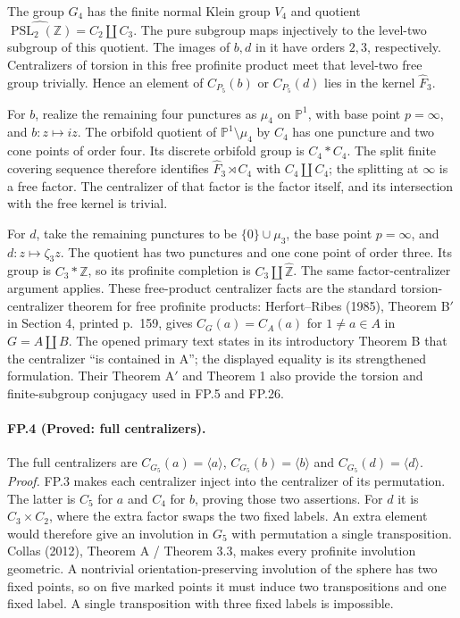 The group $G_4$ has the finite normal Klein group $V_4$ and quotient
$\widehat{\operatorname{PSL}_2(\mathbb Z)}=C_2\amalg C_3$.
The pure subgroup maps injectively to the level-two subgroup of this
quotient. The images of $b,d$ in it have orders $2,3$, respectively.
Centralizers of torsion in this free profinite product meet that level-two
free group trivially. Hence an element of $C_{P_5}(b)$ or $C_{P_5}(d)$ lies
in the kernel $\widehat F_3$.

For $b$, realize the remaining four punctures as $\mu_4$ on
$\mathbb P^1$, with base point $p=\infty$, and $b:z\mapsto iz$.
The orbifold quotient of $\mathbb P^1\setminus\mu_4$ by $C_4$ has one
puncture and two cone points of order four. Its discrete orbifold group is
$C_4*C_4$. The split finite covering sequence therefore identifies
$\widehat F_3\rtimes C_4$ with $C_4\amalg C_4$; the splitting at
$\infty$ is a free factor. The centralizer of that factor is the factor
itself, and its intersection with the free kernel is trivial.

For $d$, take the remaining punctures to be $\{0\}\cup\mu_3$, the
base point $p=\infty$, and $d:z\mapsto\zeta_3z$. The quotient has two
punctures and one cone point of order three. Its group is $C_3*\mathbb Z$,
so its profinite completion is $C_3\amalg\widehat{\mathbb Z}$.
The same factor-centralizer argument applies. These free-product
centralizer facts are the standard torsion-centralizer theorem for free
profinite products: Herfort--Ribes (1985), Theorem B$'$ in Section 4,
printed p.~159, gives $C_G(a)=C_A(a)$ for $1\ne a\in A$ in
$G=A\amalg B$. The opened primary text states in its introductory
Theorem B that the centralizer ``is contained in A''; the displayed
equality is its strengthened formulation. Their Theorem A$'$ and
Theorem 1 also provide the torsion and finite-subgroup conjugacy used
in FP.5 and FP.26.

\paragraph{FP.4 (Proved: full centralizers).}
The full centralizers are $C_{G_5}(a)=\langle a\rangle$,
$C_{G_5}(b)=\langle b\rangle$ and
$C_{G_5}(d)=\langle d\rangle$.
\emph{Proof.} FP.3 makes each centralizer inject into the centralizer of
its permutation. The latter is $C_5$ for $a$ and $C_4$ for $b$, proving
those two assertions. For $d$ it is $C_3\times C_2$, where the extra factor
swaps the two fixed labels. An extra element would therefore give an
involution in $G_5$ with permutation a single transposition. Collas (2012),
Theorem A / Theorem 3.3, makes every profinite involution geometric.
A nontrivial orientation-preserving involution of the sphere has two fixed
points, so on five marked points it must induce two transpositions and one
fixed label. A single transposition with three fixed labels is impossible.

